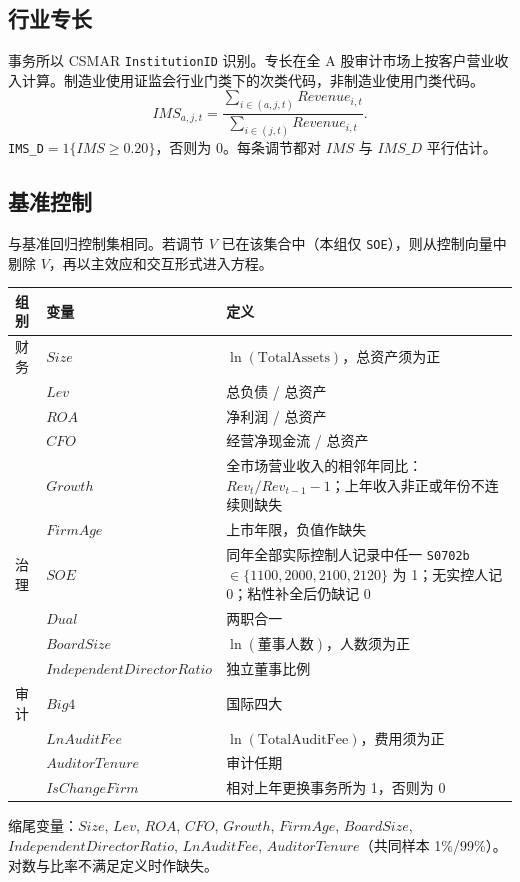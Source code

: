 \documentclass[11pt]{article}
\begin{document}
\subsection{行业专长}

事务所以 CSMAR \texttt{InstitutionID} 识别。专长在全 A 股审计市场上按客户营业收入计算。制造业使用证监会行业门类下的次类代码，非制造业使用门类代码。
\[
IMS_{a,j,t}=\frac{\sum_{i\in(a,j,t)}Revenue_{i,t}}{\sum_{i\in(j,t)}Revenue_{i,t}}.
\]
\texttt{IMS\_D}\(=1\{IMS\ge 0.20\}\)，否则为 0。每条调节都对 \(IMS\) 与 \(IMS\_D\) 平行估计。

\subsection{基准控制}

与基准回归控制集相同。若调节 \(V\) 已在该集合中（本组仅 \texttt{SOE}），则从控制向量中剔除 \(V\)，再以主效应和交互形式进入方程。

\begin{center}
\begin{threeparttable}
\caption{基准控制变量}
\begin{tabular}{llp{9.2cm}}
\toprule
组别 & 变量 & 定义 \\
\midrule
财务 & \(Size\) & \(\ln(\text{TotalAssets})\)，总资产须为正 \\
 & \(Lev\) & 总负债 / 总资产 \\
 & \(ROA\) & 净利润 / 总资产 \\
 & \(CFO\) & 经营净现金流 / 总资产 \\
 & \(Growth\) & 全市场营业收入的相邻年同比：\(Rev_t/Rev_{t-1}-1\)；上年收入非正或年份不连续则缺失 \\
 & \(FirmAge\) & 上市年限，负值作缺失 \\
治理 & \(SOE\) & 同年全部实际控制人记录中任一 \texttt{S0702b} \(\in\{1100,2000,2100,2120\}\) 为 1；无实控人记 0；粘性补全后仍缺记 0 \\
 & \(Dual\) & 两职合一 \\
 & \(BoardSize\) & \(\ln(\text{董事人数})\)，人数须为正 \\
 & \(IndependentDirectorRatio\) & 独立董事比例 \\
审计 & \(Big4\) & 国际四大 \\
 & \(LnAuditFee\) & \(\ln(\text{TotalAuditFee})\)，费用须为正 \\
 & \(AuditorTenure\) & 审计任期 \\
 & \(IsChangeFirm\) & 相对上年更换事务所为 1，否则为 0 \\
\bottomrule
\end{tabular}
\begin{tablenotes}\footnotesize
\item 缩尾变量：\(Size\), \(Lev\), \(ROA\), \(CFO\), \(Growth\), \(FirmAge\), \(BoardSize\), \(IndependentDirectorRatio\), \(LnAuditFee\), \(AuditorTenure\)（共同样本 1\%/99\%）。对数与比率不满足定义时作缺失。
\end{tablenotes}
\end{threeparttable}
\end{center}
\end{document}
